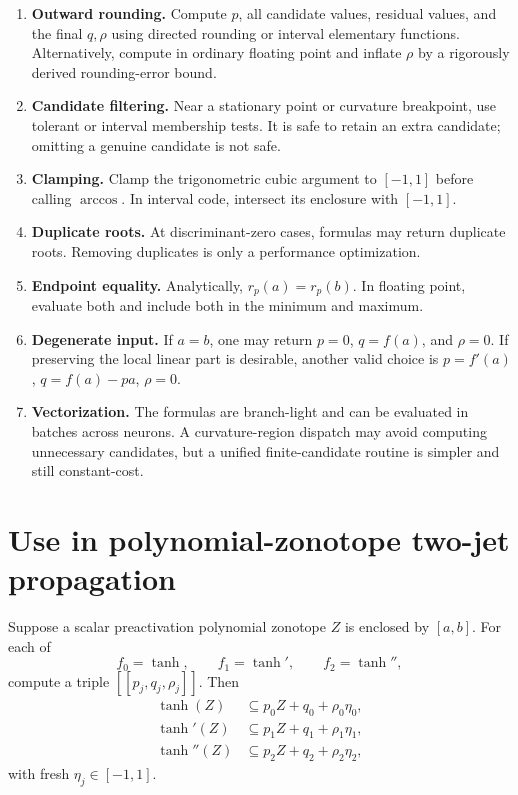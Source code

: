 \documentclass[11pt]{article}
\begin{document}
\begin{enumerate}[leftmargin=2em]
  \item \textbf{Outward rounding.} Compute \(p\), all candidate values, residual values, and the final \(q,\rho\) using directed rounding or interval elementary functions. Alternatively, compute in ordinary floating point and inflate \(\rho\) by a rigorously derived rounding-error bound.

  \item \textbf{Candidate filtering.} Near a stationary point or curvature breakpoint, use tolerant or interval membership tests. It is safe to retain an extra candidate; omitting a genuine candidate is not safe.

  \item \textbf{Clamping.} Clamp the trigonometric cubic argument to \([-1,1]\) before calling \(\arccos\). In interval code, intersect its enclosure with \([-1,1]\).

  \item \textbf{Duplicate roots.} At discriminant-zero cases, formulas may return duplicate roots. Removing duplicates is only a performance optimization.

  \item \textbf{Endpoint equality.} Analytically, \(r_p(a)=r_p(b)\). In floating point, evaluate both and include both in the minimum and maximum.

  \item \textbf{Degenerate input.} If \(a=b\), one may return \(p=0\), \(q=f(a)\), and \(\rho=0\). If preserving the local linear part is desirable, another valid choice is \(p=f'(a)\), \(q=f(a)-pa\), \(\rho=0\).

  \item \textbf{Vectorization.} The formulas are branch-light and can be evaluated in batches across neurons. A curvature-region dispatch may avoid computing unnecessary candidates, but a unified finite-candidate routine is simpler and still constant-cost.
\end{enumerate}

\section{Use in polynomial-zonotope two-jet propagation}

Suppose a scalar preactivation polynomial zonotope \(Z\) is enclosed by \([a,b]\). For each of
\[
  f_0=\tanh,\qquad f_1=\tanh',\qquad f_2=\tanh'',
\]
compute a triple \([[p_j,q_j,\rho_j]]\). Then
\begin{align}
  \tanh(Z)&\subseteq p_0Z+q_0+\rho_0\eta_0,\\
  \tanh'(Z)&\subseteq p_1Z+q_1+\rho_1\eta_1,\\
  \tanh''(Z)&\subseteq p_2Z+q_2+\rho_2\eta_2,
\end{align}
with fresh \(\eta_j\in[-1,1]\).
\end{document}
